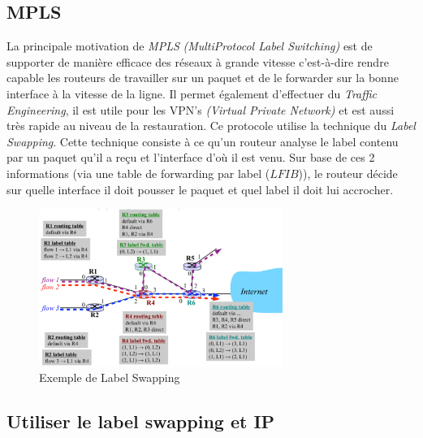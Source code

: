 \documentclass{article}
\newcommand{\term}[1]{\textit{\textcolor{maintitle}{#1}}}
\begin{document}
\begin{sffamily}
\section{MPLS}

La principale motivation de \term{MPLS} \textit{(MultiProtocol Label Switching)} est de supporter de manière efficace des 
réseaux à grande vitesse c'est-à-dire rendre capable les routeurs de travailler sur un paquet et de le forwarder sur la bonne 
interface à la vitesse de la ligne. Il permet également d'effectuer du \term{Traffic Engineering}, il est utile pour les VPN's 
\textit{(Virtual Private Network)} et est aussi très rapide au niveau de la restauration. Ce protocole utilise la technique du 
\term{Label Swapping}. Cette technique consiste à ce qu'un routeur analyse le label contenu par un paquet qu'il a reçu et 
l'interface d'où il est venu. Sur base de ces 2 informations (via une table de forwarding par label ($LFIB$)), le routeur 
décide sur quelle interface il doit pousser le paquet et quel label il doit lui accrocher.

\begin{figure}[h!]
    \begin{center}
    \includegraphics[width=300px]{img_007.pdf}
    \caption{Exemple de Label Swapping}
    \end{center}	
\end{figure}

\subsection{Utiliser le label swapping et IP}


\end{sffamily}
\end{document}
